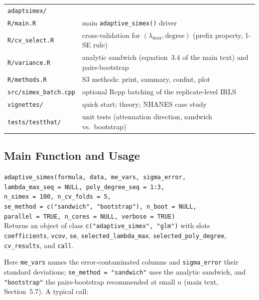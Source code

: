 \documentclass[11pt]{article}
\theoremstyle{plain}
\theoremstyle{definition}
\begin{document}
\begin{center}
\small
\begin{tabular}{ll}
\toprule
\texttt{adaptsimex/}\\
\quad\texttt{R/main.R} & main \texttt{adaptive\_simex()} driver\\
\quad\texttt{R/cv\_select.R} & cross-validation for
$(\lambda_{\max},\text{degree})$ (prefix property, 1-SE rule)\\
\quad\texttt{R/variance.R} & analytic sandwich (equation~3.4 of the main text)
and pairs-bootstrap\\
\quad\texttt{R/methods.R} & S3 methods: print, summary, confint, plot\\
\quad\texttt{src/simex\_batch.cpp} & optional Rcpp batching of the
replicate-level IRLS\\
\quad\texttt{vignettes/} & quick start; theory; NHANES case study\\
\quad\texttt{tests/testthat/} & unit tests (attenuation direction,
sandwich vs.\ bootstrap)\\
\bottomrule
\end{tabular}
\end{center}

\subsection*{Main Function and Usage}\label{sec:usage}

\begin{center}
\small
\begin{minipage}{0.93\textwidth}
\texttt{adaptive\_simex(formula, data, me\_vars, sigma\_error,\\
\quad lambda\_max\_seq = NULL, poly\_degree\_seq = 1:3,\\
\quad n\_simex = 100, n\_cv\_folds = 5,\\
\quad se\_method = c("sandwich", "bootstrap"), n\_boot = NULL,\\
\quad parallel = TRUE, n\_cores = NULL, verbose = TRUE)}\\
Returns an object of class \texttt{c("adaptive\_simex", "glm")} with
slots \texttt{coefficients}, \texttt{vcov}, \texttt{se},
\texttt{selected\_lambda\_max}, \texttt{selected\_poly\_degree},
\texttt{cv\_results}, and \texttt{call}.
\end{minipage}
\end{center}

\noindent Here \texttt{me\_vars} names the error-contaminated columns
and \texttt{sigma\_error} their standard deviations;
\texttt{se\_method = "sandwich"} uses the analytic sandwich, and
\texttt{"bootstrap"} the pairs-bootstrap recommended at small $n$
(main text, Section~5.7). A typical call:
\end{document}
